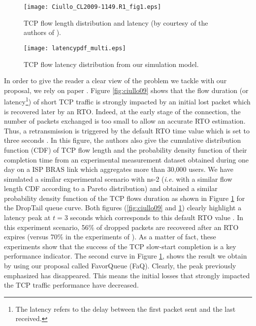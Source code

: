 \documentclass{elsart}
\begin{document}
\begin{figure}[htb!]
   \begin{minipage}[b]{1.0\columnwidth}
	\centering
	\texttt{[image: Ciullo\_CL2009-1149.R1\_fig1.eps]}
	\caption{TCP flow length distribution and latency (by courtesy of the authors of \cite{ciullo09}).}
	\label{fig:ciullo09}
   \end{minipage}
   
   \begin{minipage}[b]{1.0\columnwidth}   
	\centering
  	\texttt{[image: latencypdf\_multi.eps]}
  	\caption{TCP flow latency distribution from our simulation model.}
  	\label{fig:delaypdf}
   \end{minipage}
\end{figure}


In order to give the reader a clear view of the problem we tackle with our proposal, we rely on paper \cite{ciullo09}. 
Figure \ref{fig:ciullo09} shows that the flow duration (or latency\footnote{The latency refers to the delay between the first packet sent and the last received.}) 
of short TCP traffic is strongly impacted by an initial lost packet which is recovered later by an RTO. 
Indeed, at the early stage of the connection, the number of packets exchanged is too small to allow an accurate RTO estimation. Thus, a retransmission is triggered by the default RTO time value which is set to three seconds \cite{rfc1122}. In this figure, the authors also give the cumulative distribution function (CDF) of TCP flow length and the probability density function of their completion time from an experimental measurement dataset obtained during one day on a ISP BRAS link which aggregates more than 30,000 users. We have simulated a similar experimental scenario with ns-2 (\textit{i.e.} with a similar flow length CDF according to a Pareto distribution) and obtained a similar probability density function of the TCP flows duration as shown in Figure \ref{fig:delaypdf} for the DropTail queue curve. Both figures (\ref{fig:ciullo09} and \ref{fig:delaypdf}) clearly highlight a latency peak at $t=3$ seconds which corresponds to this default RTO value \cite{rfc1122}. In this experiment scenario, 56\% of dropped packets are recovered after an RTO expires (versus 70\% in the experiments of \cite{ciullo09}). As a matter of fact, these experiments show that the success of the TCP slow-start completion is a key performance indicator.
The second curve in Figure \ref{fig:delaypdf}, shows the result we obtain by using our proposal called FavorQueue (FaQ). Clearly, the peak previously emphasized has disappeared. This means the initial losses that strongly impacted the TCP traffic performance have decreased.
\end{document}
